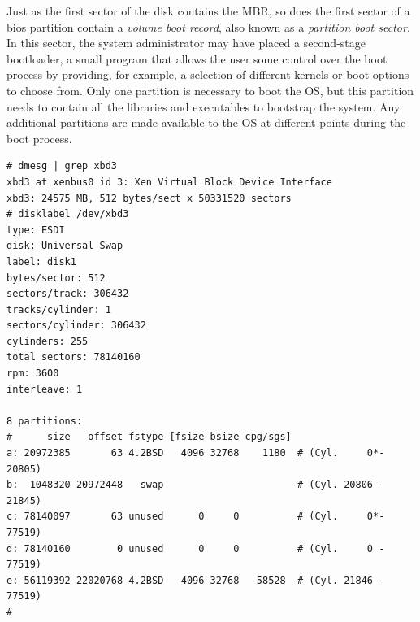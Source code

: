 Just as the first sector of the disk contains the MBR,
so does the first sector of a \gls{bios} partition
contain a {\em volume boot record}, also known as a {\em partition boot
sector}.  In this sector,
the system administrator may have placed a
second-stage bootloader, a small
program that allows the user some control over the
boot process by providing, for example, a selection of
different kernels or boot options to choose from.
Only one partition is necessary to boot the OS, but
this partition needs to contain all the libraries and
executables to bootstrap the system.  Any additional
partitions are made available to the OS at different
points during the boot process.

\begin{lstlisting}[basicstyle=\scriptsize,float,label=code:disklabel,caption=disklabel(8)
invocation and output on a NetBSD system]
# dmesg | grep xbd3
xbd3 at xenbus0 id 3: Xen Virtual Block Device Interface
xbd3: 24575 MB, 512 bytes/sect x 50331520 sectors
# disklabel /dev/xbd3
type: ESDI
disk: Universal Swap
label: disk1
bytes/sector: 512
sectors/track: 306432
tracks/cylinder: 1
sectors/cylinder: 306432
cylinders: 255
total sectors: 78140160
rpm: 3600
interleave: 1

8 partitions:
#      size   offset fstype [fsize bsize cpg/sgs]
a: 20972385       63 4.2BSD   4096 32768    1180  # (Cyl.     0*- 20805)
b:  1048320 20972448   swap                       # (Cyl. 20806 - 21845)
c: 78140097       63 unused      0     0          # (Cyl.     0*- 77519)
d: 78140160        0 unused      0     0          # (Cyl.     0 - 77519)
e: 56119392 22020768 4.2BSD   4096 32768   58528  # (Cyl. 21846 - 77519)
#
\end{lstlisting}


